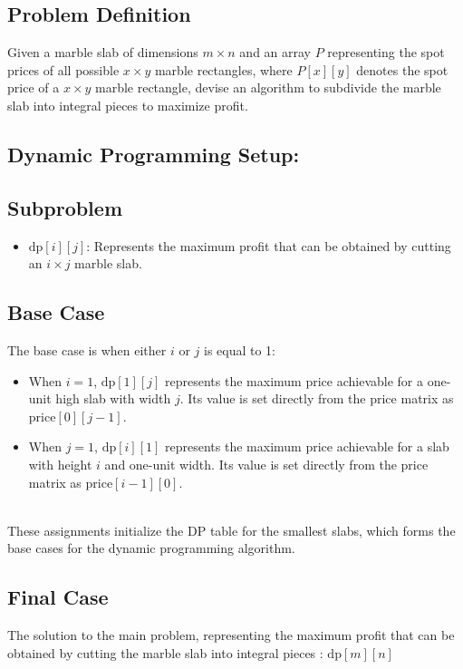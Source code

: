 \documentclass{article}
\begin{document}
{\subsection*{Problem Definition}
Given a marble slab of dimensions $m \times n$ and an array $P$ representing the spot prices of all possible $x \times y$ marble rectangles, where $P[x][y]$ denotes the spot price of a $x \times y$ marble rectangle, devise an algorithm to subdivide the marble slab into integral pieces to maximize profit.

\subsection*{Dynamic Programming Setup:}
\subsection*{Subproblem}
\begin{itemize}
    \item $\text{dp}[i][j]$: Represents the maximum profit that can be obtained by cutting an $i \times j$ marble slab.
\end{itemize}

\subsection*{Base Case}
The base case is when either \( i \) or \( j \) is equal to 1:

\begin{itemize}
    \item When \( i = 1 \), \( \text{dp}[1][j] \) represents the maximum price achievable for a one-unit high slab with width \( j \). Its value is set directly from the \( \text{price} \) matrix as \( \text{price}[0][j - 1] \).
    \item When \( j = 1 \), \( \text{dp}[i][1] \) represents the maximum price achievable for a slab with height \( i \) and one-unit width. Its value is set directly from the \( \text{price} \) matrix as \( \text{price}[i - 1][0] \).
\end{itemize}
\\
These assignments initialize the DP table for the smallest slabs, which forms the base cases for the dynamic programming algorithm.

\subsection*{Final Case}
The solution to the main problem, representing the maximum profit that can be obtained by cutting the marble slab into integral pieces :   $\text{dp}[m][n]$

}
\end{document}
